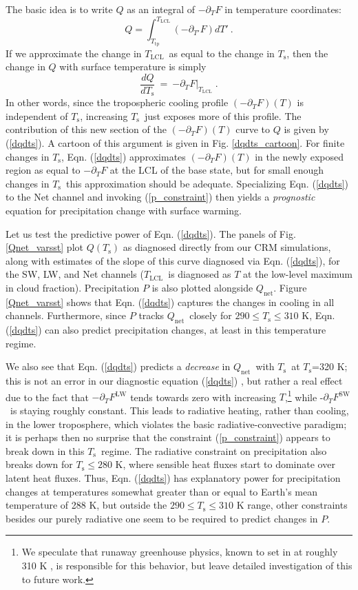 \documentclass[10pt]{article}
\newcommand{\beqn}{\begin{equation}}
\newcommand{\eeqn}{\end{equation}}
\newcommand{\eqnref}[1]{(\ref{#1})}
\newcommand{\n}{\nonumber}
\newcommand{\der}[2]{\ensuremath{\frac{d #1}{d #2}}}
\newcommand{\ppt}{\ensuremath{\partial_T}}
\newcommand{\Qnet}{\ensuremath{Q_\mathrm{net}}}
\newcommand{\FLW}{\ensuremath{F^\mathrm{LW}}}
\newcommand{\FSW}{\ensuremath{F^\mathrm{SW}}}
\newcommand{\Ts}{\ensuremath{T_\mathrm{s}}}
\newcommand{\Tlcl}{\ensuremath{T_\mathrm{LCL}}}
\newcommand{\Ttp}{\ensuremath{T_\mathrm{tp}}}
\begin{document}
	  The basic idea is to write $Q$ as an integral of $-\ppt F$  in temperature coordinates: 
	\beqn
		Q =  \int_{\Ttp}^{\Tlcl} (-\partial_{T'} F) dT' \ . 
		\n
	\eeqn
   If we approximate the change in  \Tlcl\ as equal to the change in \Ts, then the change in $Q$ with surface temperature is  simply
	\beqn
		\der{Q}{\Ts} \ =\  \left.  -\ppt F\right|_{\Tlcl}  \; .
	\label{dqdts}
	\eeqn
In other words, since the tropospheric cooling profile $(-\ppt F)(T)$  is independent of \Ts, increasing \Ts\ just exposes more of this profile.  The contribution of this new section of the $(-\ppt F)(T)$ curve to $Q$ is given by \eqnref{dqdts}.  A cartoon of this argument is given in Fig. \ref{dqdts_cartoon}. For finite changes in \Ts, Eqn. \eqnref{dqdts} approximates $(-\ppt F)(T)$ in the newly exposed region as equal to $-\ppt F$ at the LCL of the base state, but for small enough changes in \Ts\ this approximation should be adequate. Specializing Eqn. \eqnref{dqdts} to the Net channel and invoking \eqnref{p_constraint} then yields a \emph{prognostic} equation for precipitation change with surface warming.

Let us test the predictive power of Eqn. \eqnref{dqdts}. The panels of Fig. \ref{Qnet_varsst} plot $Q(\Ts)$ as diagnosed directly from our CRM simulations, along with estimates of the slope of this curve diagnosed via  Eqn. \eqnref{dqdts}, for the SW, LW, and Net  channels (\Tlcl\ is diagnosed as $T$ at the low-level maximum in cloud fraction). Precipitation $P$ is also plotted alongside $\Qnet$.  Figure \ref{Qnet_varsst} shows that  Eqn. \eqnref{dqdts}  captures the changes in  cooling in all channels. Furthermore, since $P$ tracks \Qnet\ closely for $290\leq \Ts \leq 310$ K, Eqn. \eqnref{dqdts} can also predict precipitation changes, at least in this temperature regime.

We also see that  Eqn. \eqnref{dqdts} predicts a \emph{decrease} in  \Qnet\ with \Ts\ at \Ts=320 K; this is not an error in our diagnostic equation \eqnref{dqdts} , but rather a real effect due to the fact that $-\ppt \FLW$ tends towards zero with increasing $T$,\footnote{We speculate that runaway greenhouse physics, known to set in at roughly 310 K \citep{goldblatt2013}, is responsible for this behavior, but leave detailed investigation of this to future work.} while -\ppt \FSW\ is staying roughly constant. This leads to radiative heating, rather than cooling, in the  lower troposphere, which violates the basic radiative-convective paradigm; it is perhaps then no surprise that the constraint \eqnref{p_constraint} appears to break down in this \Ts\ regime. The radiative constraint on precipitation also breaks down for $\Ts \leq 280$ K, where sensible heat fluxes start to dominate over latent heat fluxes. Thus, Eqn. \eqnref{dqdts} has explanatory power for  precipitation changes at  temperatures somewhat greater than or equal to Earth's mean temperature of 288 K, but outside the $290\leq \Ts \leq 310$ K range, other constraints besides our purely radiative one seem to be required to predict changes in $P$.
\end{document}

